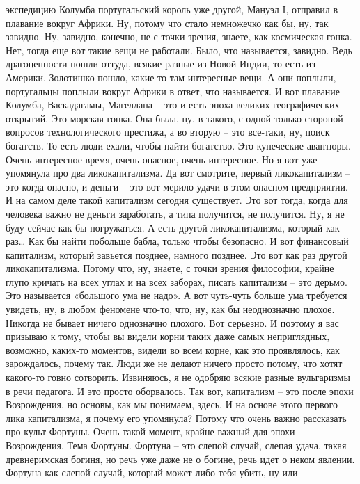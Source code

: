 экспедицию Колумба португальский король уже другой, Мануэл I, отправил в
плавание вокруг Африки. Ну, потому что стало немножечко как бы, ну, так завидно.
Ну, завидно, конечно, не с точки зрения, знаете, как космическая гонка. Нет,
тогда еще вот такие вещи не работали. Было, что называется, завидно. Ведь
драгоценности пошли оттуда, всякие разные из Новой Индии, то есть из Америки.
Золотишко пошло, какие-то там интересные вещи. А они поплыли, португальцы
поплыли вокруг Африки в ответ, что называется. И вот плавание Колумба,
Васкадагамы, Магеллана – это и есть эпоха великих географических открытий. Это
морская гонка. Она была, ну, в такого, с одной только стороной вопросов
технологического престижа, а во вторую – это все-таки, ну, поиск богатств. То
есть люди ехали, чтобы найти богатство. Это купеческие авантюры. Очень
интересное время, очень опасное, очень интересное. Но я вот уже упомянула про
два ликокапитализма. Да вот смотрите, первый ликокапитализм – это когда опасно,
и деньги – это вот мерило удачи в этом опасном предприятии. И на самом деле
такой капитализм сегодня существует. Это вот тогда, когда для человека важно не
деньги заработать, а типа получится, не получится. Ну, я не буду сейчас как бы
погружаться. А есть другой ликокапитализма, который как раз… Как бы найти
побольше бабла, только чтобы безопасно. И вот финансовый капитализм, который
завьется позднее, намного позднее. Это вот как раз другой ликокапитализма.
Потому что, ну, знаете, с точки зрения философии, крайне глупо кричать на всех
углах и на всех заборах, писать капитализм – это дерьмо. Это называется
«большого ума не надо». А вот чуть-чуть больше ума требуется увидеть, ну, в
любом феномене что-то, что, ну, как бы неоднозначно плохое. Никогда не бывает
ничего однозначно плохого. Вот серьезно. И поэтому я вас призываю к тому, чтобы
вы видели корни таких даже самых неприглядных, возможно, каких-то моментов,
видели во всем корне, как это проявлялось, как зарождалось, почему так. Люди же
не делают ничего просто потому, что хотят какого-то говно сотворить. Извиняюсь,
я не одобряю всякие разные вульгаризмы в речи педагога. И это просто оборвалось.
Так вот, капитализм – это после эпохи Возрождения, но основы, как мы понимаем,
здесь. И на основе этого первого лика капитализма, я почему его упомянула?
Потому что очень важно рассказать про культ Фортуны. Очень такой момент, крайне
важный для эпохи Возрождения. Тема Фортуны. Фортуна – это слепой случай, слепая
удача, такая древнеримская богиня, но речь уже даже не о богине, речь идет о
неком явлении. Фортуна как слепой случай, который может либо тебя убить, ну или
